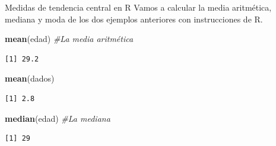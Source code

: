 \documentclass[
  ignorenonframetext,
]{beamer}
\newenvironment{Shaded}{\begin{snugshade}}{\end{snugshade}}
\newcommand{\CommentTok}[1]{\textcolor[rgb]{0.56,0.35,0.01}{\textit{#1}}}
\newcommand{\FunctionTok}[1]{\textcolor[rgb]{0.13,0.29,0.53}{\textbf{#1}}}
\newcommand{\NormalTok}[1]{#1}
\begin{document}
\begin{frame}[fragile]{Medidas de tendencia central en R}
\label{medidas-de-tendencia-central-en-r}
Vamos a calcular la media aritmética, mediana y moda de los dos ejemplos
anteriores con instrucciones de R.

\begin{Shaded}
\begin{Highlighting}[]
\FunctionTok{mean}\NormalTok{(edad) }\CommentTok{\#La media aritmética}
\end{Highlighting}
\end{Shaded}

\begin{verbatim}
[1] 29.2
\end{verbatim}

\begin{Shaded}
\begin{Highlighting}[]
\FunctionTok{mean}\NormalTok{(dados)}
\end{Highlighting}
\end{Shaded}

\begin{verbatim}
[1] 2.8
\end{verbatim}

\begin{Shaded}
\begin{Highlighting}[]
\FunctionTok{median}\NormalTok{(edad) }\CommentTok{\#La mediana}
\end{Highlighting}
\end{Shaded}

\begin{verbatim}
[1] 29
\end{verbatim}
\end{frame}
\end{document}
